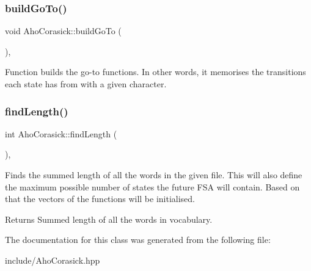 \subsubsection{\texorpdfstring{build\+Go\+To()}{buildGoTo()}}
{\footnotesize\ttfamily void Aho\+Corasick\+::build\+Go\+To (\begin{DoxyParamCaption}{ }\end{DoxyParamCaption})\hspace{0.3cm}{\ttfamily [inline]}, {\ttfamily [private]}}

Function builds the go-\/to functions. In other words, it memorises the transitions each state has from with a given character. \mbox{\label{classAhoCorasick_a7ef8e2eeeb8ce582283ee73198325f1b}} 
\subsubsection{\texorpdfstring{find\+Length()}{findLength()}}
{\footnotesize\ttfamily int Aho\+Corasick\+::find\+Length (\begin{DoxyParamCaption}{ }\end{DoxyParamCaption})\hspace{0.3cm}{\ttfamily [inline]}, {\ttfamily [private]}}

Finds the summed length of all the words in the given file. This will also define the maximum possible number of states the future F\+SA will contain. Based on that the vectors of the functions will be initialised.

\begin{DoxyReturn}{Returns}
Summed length of all the words in vocabulary. 
\end{DoxyReturn}


The documentation for this class was generated from the following file\+:\begin{DoxyCompactItemize}
\item 
include/Aho\+Corasick.\+hpp\end{DoxyCompactItemize}
